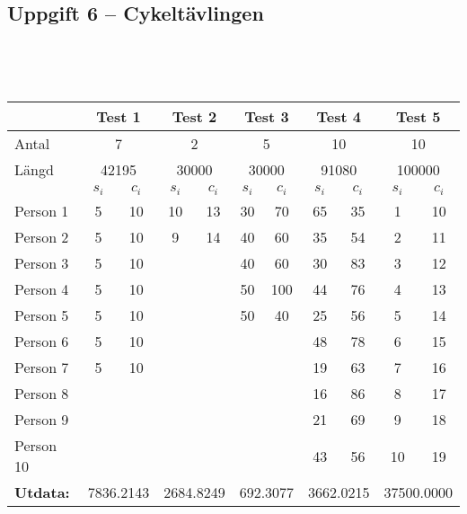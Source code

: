 \documentclass[a4paper,12pt,oneside]{amsbook}
\theoremstyle{test}
\newcommand{\fe}[1]{\textbf{#1}}            %
\begin{document}
\subsection*{Uppgift 6 -- Cykeltävlingen}
~\\
{\tt 
\begin{tabular}{||l||c|c||c|c||c|c||c|c||c|c||}\hline\hline
& \multicolumn{2}{c||}{\fe{Test 1}} & \multicolumn{2}{c||}{\fe{Test 2}}& \multicolumn{2}{c||}{\fe{Test 3}} & \multicolumn{2}{c||}{\fe{Test 4}} & \multicolumn{2}{c||}{\fe{Test 5}} \\\hline\hline
Antal & \multicolumn{2}{c||}{ 7 }& \multicolumn{2}{c||}{ 2} & \multicolumn{2}{c||}{ 5} & \multicolumn{2}{c||}{ 10}& \multicolumn{2}{c||}{ 10}\\ \hline
Längd& \multicolumn{2}{c||}{ 42195 }& \multicolumn{2}{c||}{ 30000} & \multicolumn{2}{c||}{ 30000} & \multicolumn{2}{c||}{ 91080}& \multicolumn{2}{c||}{ 100000}\\ \hline
& \fe{$s_i$} & \fe{$c_i$} & \fe{$s_i$} & \fe{$c_i$}& \fe{$s_i$} & \fe{$c_i$}& \fe{$s_i$} & \fe{$c_i$}& \fe{$s_i$} & \fe{$c_i$} \\ \hline
Person 1	&	5	&	10	&	10	&	13	&	30	&	70	&	65	&	35	&	1	&	10	\\
Person 2	&	5	&	10	&	9	&	14	&	40	&	60	&	35	&	54	&	2	&	11	\\
Person 3	&	5	&	10	&		&		&	40	&	60	&	30	&	83	&	3	&	12	\\
Person 4	&	5	&	10	&		&		&	50	&	100	&	44	&	76	&	4	&	13	\\
Person 5	&	5	&	10	&		&		&	50	&	40	&	25	&	56	&	5	&	14	\\
Person 6	&	5	&	10	&		&		&		&		&	48	&	78	&	6	&	15	\\
Person 7	&	5	&	10	&		&		&		&		&	19	&	63	&	7	&	16	\\
Person 8	&		&		&		&		&		&		&	16	&	86	&	8	&	17	\\
Person 9	&		&		&		&		&		&		&	21	&	69	&	9	&	18	\\
Person 10	&		&		&		&		&		&		&	43	&	56	&	10	&	19	\\ \hline\hline
\fe{Utdata:} & \multicolumn{2}{c||}{ 7836.2143 }& \multicolumn{2}{c||}{ 2684.8249} & \multicolumn{2}{c||}{ 692.3077} & \multicolumn{2}{c||}{ 3662.0215}& \multicolumn{2}{c||}{ 37500.0000} \\ \hline\hline
\end{tabular}
}
\end{document}
